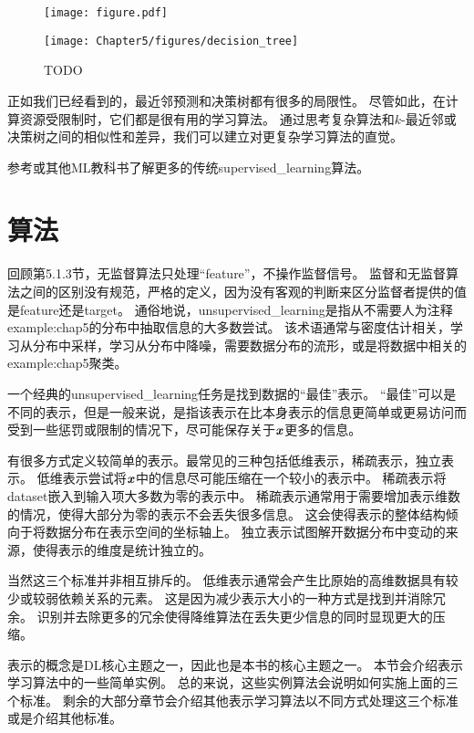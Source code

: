 \begin{figure}[!htb]
\ifOpenSource
\centerline{\texttt{[image: figure.pdf]}}
\else
\centerline{\texttt{[image: Chapter5/figures/decision\_tree]}}
\fi
\caption{TODO}
\label{fig:chap5_decision_tree}
\end{figure}

正如我们已经看到的，最近邻预测和决策树都有很多的局限性。
尽管如此，在计算资源受限制时，它们都是很有用的学习算法。
通过思考复杂算法和$k$-最近邻或决策树之间的相似性和差异，我们可以建立对更复杂学习算法的直觉。

参考\cite{MurphyBook2012,bishop-book2006,Hastie2001}或其他\gls{ML}教科书了解更多的传统\gls{supervised_learning}算法。

\section{算法}
\label{sec:unsupervised_learning_algorithms}
回顾第5.1.3节，无监督算法只处理“\gls{feature}”，不操作监督信号。
监督和无监督算法之间的区别没有规范，严格的定义，因为没有客观的判断来区分监督者提供的值是\gls{feature}还是\gls{target}。
通俗地说，\gls{unsupervised_learning}是指从不需要人为注释\gls{example:chap5}的分布中抽取信息的大多数尝试。
该术语通常与密度估计相关，学习从分布中采样，学习从分布中降噪，需要数据分布的流形，或是将数据中相关的\gls{example:chap5}聚类。

一个经典的\gls{unsupervised_learning}任务是找到数据的“最佳”表示。
“最佳”可以是不同的表示，但是一般来说，是指该表示在比本身表示的信息更简单或更易访问而受到一些惩罚或限制的情况下，尽可能保存关于$\boldsymbol{\mathit{x}}$更多的信息。 


有很多方式定义较简单的表示。最常见的三种包括低维表示，稀疏表示，独立表示。
低维表示尝试将$\boldsymbol{\mathit{x}}$中的信息尽可能压缩在一个较小的表示中。
稀疏表示将\gls{dataset}嵌入到输入项大多数为零的表示中\citep{Barlow89,Olshausen+Field-1996,Hinton+Ghahramani-97}。
稀疏表示通常用于需要增加表示维数的情况，使得大部分为零的表示不会丢失很多信息。
这会使得表示的整体结构倾向于将数据分布在表示空间的坐标轴上。
独立表示试图解开数据分布中变动的来源，使得表示的维度是统计独立的。

当然这三个标准并非相互排斥的。
低维表示通常会产生比原始的高维数据具有较少或较弱依赖关系的元素。
这是因为减少表示大小的一种方式是找到并消除冗余。
识别并去除更多的冗余使得降维算法在丢失更少信息的同时显现更大的压缩。

表示的概念是\gls{DL}核心主题之一，因此也是本书的核心主题之一。
本节会介绍表示学习算法中的一些简单实例。
总的来说，这些实例算法会说明如何实施上面的三个标准。
剩余的大部分章节会介绍其他表示学习算法以不同方式处理这三个标准或是介绍其他标准。

